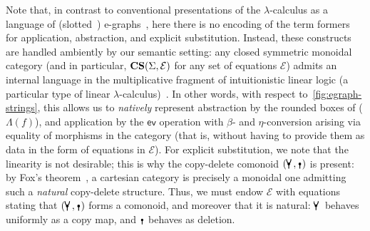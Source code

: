 Note that, in contrast to conventional presentations of the $\lambda$-calculus as a language of (slotted~\cite[Example 1]{slotted-egraphs}) e-graphs~\cite[Figure 10]{EggPaper}, here there is no encoding of the term formers for application, abstraction, and explicit substitution.
Instead, these constructs are handled ambiently by our semantic setting: any closed symmetric monoidal category (and in particular, $\mathbf{CS}(\Sigma, \mathcal{E})$ for any set of equations $\mathcal{E}$) admits an internal language in the multiplicative fragment of intuitionistic linear logic (a particular type of linear $\lambda$-calculus)~\cite[§ 1.7.3]{abramskyIntroductionCategoriesCategorical2010}.
In other words, with respect to~\autoref{fig:egraph-strings}, this allows us to \emph{natively} represent abstraction by the rounded boxes of ($\Lambda(f)$), and application by the $\textsf{ev}$ operation with $\beta$- and $\eta$-conversion arising via equality of morphisms in the category (that is, without having to provide them as data in the form of equations in $\mathcal{E}$).
For explicit substitution, we note that the linearity is not desirable; this is why the copy-delete comonoid $(\comonoid, \counit)$ is present: by Fox's theorem~\cite{foxCoalgebrasCartesianCategories1976}, a cartesian category is precisely a monoidal one admitting such a \emph{natural} copy-delete structure.
Thus, we must endow $\mathcal{E}$ with equations stating that $(\comonoid, \counit)$ forms a comonoid, and moreover that it is natural: $\comonoid$ behaves uniformly as a copy map, and $\counit$ behaves as deletion.


